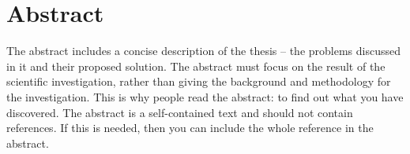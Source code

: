 \chapter*{Abstract}

The abstract includes a concise description of the thesis – the problems discussed in it and their proposed solution.  The abstract must focus on the result of the scientific investigation, rather than giving the background and methodology for the investigation.  This is why people read the abstract: to find out what you have discovered. The abstract is a self-contained text and should not contain references. If this is needed, then you can include the whole reference in the abstract.







